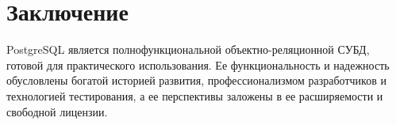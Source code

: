 \section*{Заключение}\label{sec:conclusion}

PostgreSQL является полнофункциональной объектно-реляционной СУБД, готовой для практического использования. Ее функциональность и надежность обусловлены богатой историей развития, профессионализмом разработчиков и технологией тестирования, а ее перспективы заложены в ее расширяемости и свободной лицензии.

\newpage